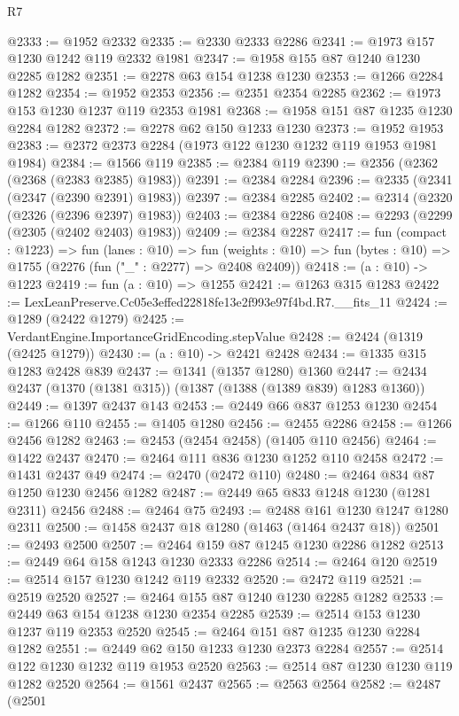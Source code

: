\begin{lexlean}{R7}
\begin{coremodule}
@2333 := @1952 @2332
@2335 := @2330 @2333 @2286
@2341 := @1973 @157 @1230 @1242 @119 @2332 @1981
@2347 := @1958 @155 @87 @1240 @1230 @2285 @1282
@2351 := @2278 @63 @154 @1238 @1230
@2353 := @1266 @2284 @1282
@2354 := @1952 @2353
@2356 := @2351 @2354 @2285
@2362 := @1973 @153 @1230 @1237 @119 @2353 @1981
@2368 := @1958 @151 @87 @1235 @1230 @2284 @1282
@2372 := @2278 @62 @150 @1233 @1230
@2373 := @1952 @1953
@2383 := @2372 @2373 @2284 (@1973 @122 @1230 @1232 @119 @1953 @1981 @1984)
@2384 := @1566 @119
@2385 := @2384 @119
@2390 := @2356 (@2362 (@2368 (@2383 @2385) @1983))
@2391 := @2384 @2284
@2396 := @2335 (@2341 (@2347 (@2390 @2391) @1983))
@2397 := @2384 @2285
@2402 := @2314 (@2320 (@2326 (@2396 @2397) @1983))
@2403 := @2384 @2286
@2408 := @2293 (@2299 (@2305 (@2402 @2403) @1983))
@2409 := @2384 @2287
@2417 := fun (compact : @1223) =>
  fun (lanes : @10) =>
  fun (weights : @10) => fun (bytes : @10) => @1755 (@2276 (fun ("_" : @2277) => @2408 @2409))
@2418 := (a : @10) -> @1223
@2419 := fun (a : @10) => @1255
@2421 := @1263 @315 @1283
@2422 := LexLeanPreserve.Cc05e3effed22818fe13e2f993e97f4bd.R7.__fits_11
@2424 := @1289 (@2422 @1279)
@2425 := VerdantEngine.ImportanceGridEncoding.stepValue
@2428 := @2424 (@1319 (@2425 @1279))
@2430 := (a : @10) -> @2421 @2428
@2434 := @1335 @315 @1283 @2428 @839
@2437 := @1341 (@1357 @1280) @1360
@2447 := @2434 @2437 (@1370 (@1381 @315)) (@1387 (@1388 (@1389 @839) @1283 @1360))
@2449 := @1397 @2437 @143
@2453 := @2449 @66 @837 @1253 @1230
@2454 := @1266 @110
@2455 := @1405 @1280
@2456 := @2455 @2286
@2458 := @1266 @2456 @1282
@2463 := @2453 (@2454 @2458) (@1405 @110 @2456)
@2464 := @1422 @2437
@2470 := @2464 @111 @836 @1230 @1252 @110 @2458
@2472 := @1431 @2437 @49
@2474 := @2470 (@2472 @110)
@2480 := @2464 @834 @87 @1250 @1230 @2456 @1282
@2487 := @2449 @65 @833 @1248 @1230 (@1281 @2311) @2456
@2488 := @2464 @75
@2493 := @2488 @161 @1230 @1247 @1280 @2311
@2500 := @1458 @2437 @18 @1280 (@1463 (@1464 @2437 @18))
@2501 := @2493 @2500
@2507 := @2464 @159 @87 @1245 @1230 @2286 @1282
@2513 := @2449 @64 @158 @1243 @1230 @2333 @2286
@2514 := @2464 @120
@2519 := @2514 @157 @1230 @1242 @119 @2332
@2520 := @2472 @119
@2521 := @2519 @2520
@2527 := @2464 @155 @87 @1240 @1230 @2285 @1282
@2533 := @2449 @63 @154 @1238 @1230 @2354 @2285
@2539 := @2514 @153 @1230 @1237 @119 @2353 @2520
@2545 := @2464 @151 @87 @1235 @1230 @2284 @1282
@2551 := @2449 @62 @150 @1233 @1230 @2373 @2284
@2557 := @2514 @122 @1230 @1232 @119 @1953 @2520
@2563 := @2514 @87 @1230 @1230 @119 @1282 @2520
@2564 := @1561 @2437
@2565 := @2563 @2564
@2582 := @2487
    (@2501

\end{coremodule}
\end{lexlean}
